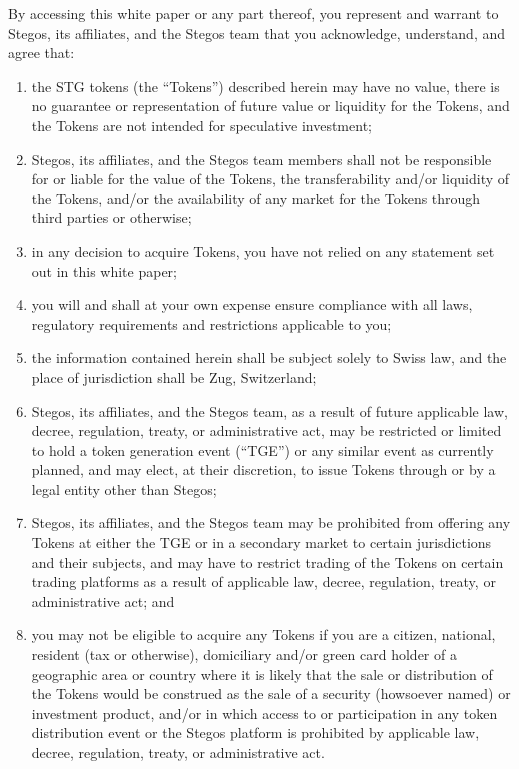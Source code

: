 \documentclass[8pt,fleqn,openany]{book}
\begin{document}
By accessing this white paper or any part thereof, you represent and warrant to Stegos, its affiliates, and the Stegos team that you acknowledge, understand, and agree that: 

\begin{enumerate}[label=(\alph*)]
	\item the STG tokens (the “Tokens”) described herein may have no value, there is no guarantee or representation of future value or liquidity for the Tokens, and the Tokens are not intended for speculative investment; 

	\item Stegos, its affiliates, and the Stegos team members shall not be responsible for or liable for the value of the Tokens, the transferability and/or liquidity of the Tokens, and/or the availability of any market for the Tokens through third parties or otherwise; 

	\item in any decision to acquire Tokens, you have not relied on any statement set out in this white paper; 

	\item you will and shall at your own expense ensure compliance with all laws, regulatory requirements and restrictions applicable to you; 

	\item the information contained herein shall be subject solely to Swiss law, and the place of jurisdiction shall be Zug, Switzerland; 

	\item Stegos, its affiliates, and the Stegos team, as a result of future applicable law, decree, regulation, treaty, or administrative act, may be restricted or limited to hold a token generation event (“TGE”) or any similar event as currently planned, and may elect, at their discretion, to issue Tokens through or by a legal entity other than Stegos; 

	\item Stegos, its affiliates, and the Stegos team may be prohibited from offering any Tokens at either the TGE or in a secondary market to certain jurisdictions and their subjects, and may have to restrict trading of the Tokens on certain trading platforms as a result of applicable law, decree, regulation, treaty, or administrative act; and 

	\item you may not be eligible to acquire any Tokens if you are a citizen, national, resident (tax or otherwise), domiciliary and/or green card holder of a geographic area or country where it is likely that the sale or distribution of the Tokens would be construed as the sale of a security (howsoever named) or investment product, and/or in which access to or participation in any token distribution event or the Stegos platform is prohibited by applicable law, decree, regulation, treaty, or administrative act. 

\end{enumerate}
\end{document}
